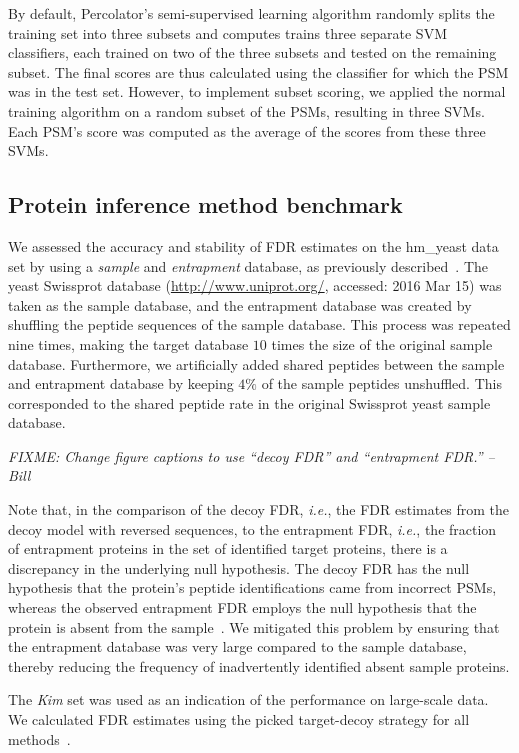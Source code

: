 \documentclass{article}
\begin{document}
By default, Percolator's semi-supervised learning algorithm randomly
splits the training set into three subsets and computes trains three
separate SVM classifiers, each trained on two of the three subsets and
tested on the remaining subset.  The final scores are thus calculated
using the classifier for which the PSM was in the test set. However,
to implement subset scoring, we applied the normal training algorithm
on a random subset of the PSMs, resulting in three SVMs.  Each PSM's
score was computed as the average of the scores from these three SVMs.

\subsection*{Protein inference method benchmark}

We assessed the accuracy and stability of FDR estimates on the
hm\_yeast data set by using a {\em sample} and {\em entrapment}
database, as previously described~\cite{granholm2013determining}. The
yeast Swissprot database (\url{http://www.uniprot.org/}, accessed:
2016 Mar 15) was taken as the sample database, and the entrapment
database was created by shuffling the peptide sequences of the sample
database. This process was repeated nine times, making the target
database $10$ times the size of the original sample database.
Furthermore, we artificially added shared peptides between the sample
and entrapment database by keeping $4\%$ of the sample peptides
unshuffled. This corresponded to the shared peptide rate in the
original Swissprot yeast sample database.

{\em FIXME: Change figure captions to use ``decoy FDR'' and
  ``entrapment FDR.'' --Bill}

Note that, in the comparison of the decoy FDR, {\em i.e.}, the FDR 
estimates from the decoy model with reversed sequences, to the 
entrapment FDR, {\em i.e.}, the fraction of entrapment proteins in the 
set of identified target proteins, there is a discrepancy in the 
underlying null hypothesis. The decoy FDR has the null hypothesis that 
the protein's peptide identifications came from incorrect PSMs, 
whereas the observed entrapment FDR employs the null hypothesis that 
the protein is absent from the sample~\cite{the:how}. We mitigated 
this problem by ensuring that the entrapment database was very large 
compared to the sample database, thereby reducing the frequency of 
inadvertently identified absent sample proteins.

The {\em Kim} set was used as an indication of the performance on
large-scale data. We calculated FDR estimates
using the picked target-decoy strategy for all
methods~\cite{savitski2015scalable}.
\end{document}
